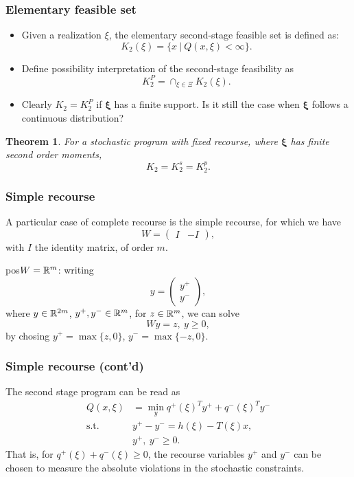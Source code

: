 \documentclass{beamer}
\newtheorem{theo}{Theorem}
\def\bxi{\boldsymbol\xi}
\def\bxi{\boldsymbol\xi}
\begin{document}
\begin{frame}
\frametitle{Elementary feasible set}

\begin{itemize}
	\item 
Given a realization $\xi$, the {\red elementary second-stage feasible set} is defined as:
\[
K_2(\xi) = \lbrace x \ |\ Q(x,\xi) < \infty \rbrace.
\]
\item
Define {\red possibility interpretation} of the second-stage feasibility as
\[
K_2^P = \cap_{\xi \in \Xi} K_2(\xi).
\]
\item
Clearly $K_2 = K_2^P$ if $\bxi$ has a finite support.
Is it still the case when $\bxi$ follows a continuous distribution?
\end{itemize}

\begin{theo}
For a stochastic program with fixed recourse, where $\bxi$ has finite second order moments,
$$K_2 = K_2^s = K_2^p.$$
\end{theo}

\end{frame}

\begin{frame}
\frametitle{Simple recourse}

A particular case of complete recourse is the {\red simple recourse}, for which we have
\[
W = \begin{pmatrix} I & -I \end{pmatrix},
\]
with $I$ the identity matrix, of order $m$.

\mbox{}

pos$W = {\mathbb{R}}^m$: writing
$$
y = \begin{pmatrix}
	y^+ \\ y^-
\end{pmatrix},
$$
where $y \in {\mathbb{R}}^{2m}$, $y^+, y^- \in {\mathbb{R}}^m$, for $z \in {\mathbb{R}}^m$, we can solve
$$
Wy = z,\ y \geq 0,
$$
by chosing $y^+ = \max\{z,0\}$,  $y^- = \max\{-z,0\}$.

\end{frame}

\begin{frame}
\frametitle{Simple recourse (cont'd)}

The second stage program can be read as
\begin{align*}
Q(x,\xi) & = \min_y q^+(\xi)^Ty^+ + q^-(\xi)^Ty^- \\
\mbox{s.t. } & y^+ - y^- = h(\xi)-T(\xi)x,\\
& y^+,\ y^- \geq 0.
\end{align*}
That is, for $q^+(\xi) + q^-(\xi) \geq 0$, the recourse variables $y^+$ and $y^-$ can be chosen to %
measure the absolute violations in the stochastic constraints.

\end{frame}
\end{document}
